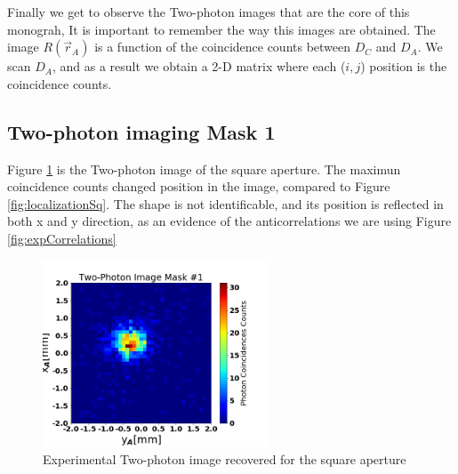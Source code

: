 Finally we get to observe the Two-photon images that are the core of this monograh,
It is important to remember the way this images are obtained. The image $R(\vec{r}_A)$ is a 
function of the coincidence counts between $D_C$ and $D_A$. We scan $D_A$, and as a 
result we obtain a 2-D matrix where each ($i,j$) position is the coincidence counts.

\subsection{Two-photon imaging Mask 1}

Figure \ref{fig:twoPhotonSq} is the Two-photon image of the square aperture. The maximun
coincidence counts changed position in the image, compared to Figure \ref{fig:localizationSq}.
The shape is not identificable,  and its position
is reflected in both x and y direction, as an evidence of the anticorrelations we are using Figure \ref{fig:expCorrelations} 
\begin{figure}[h!]
\centering
\includegraphics[width=0.6\textwidth]{Figures/two-photonImageSq.png} 
\caption{Experimental Two-photon image recovered for the square aperture}
\label{fig:twoPhotonSq}
\end{figure}

